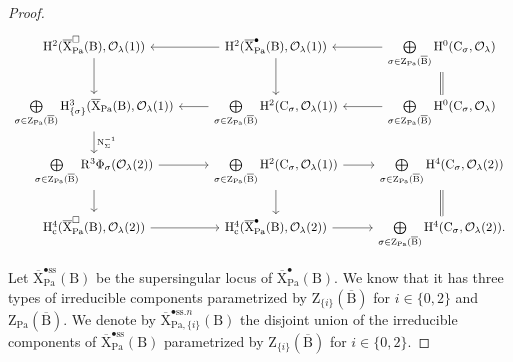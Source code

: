 \documentclass[10pt]{amsart}
\numberwithin{equation}{section}
\theoremstyle{definition}
\def\Pa{\mathrm{Pa}}
\def\calO{\mathcal{O}}
\def\rmc{\mathrm{c}}
\def\rmB{\mathrm{B}}
\def\rmC{\mathrm{C}}
\def\rmH{\mathrm{H}}
\def\rmN{\mathrm{N}}
\def\rmR{\mathrm{R}}
\def\rmX{\mathrm{X}}
\def\rmZ{\mathrm{Z}}
\begin{document}
\begin{proof}
\begin{equation*}
\begin{tikzcd}
\rmH^{2}(\overline{\rmX}^{\square}_{\Pa}(\rmB), \calO_{\lambda}(1)) \arrow[d] & \rmH^{2}(\overline{\rmX}^{\bullet}_{\Pa}(\rmB), \calO_{\lambda}(1)) \arrow[l] \arrow[d] & \bigoplus\limits_{\sigma\in \rmZ_{\Pa}(\overline{\rmB})}\rmH^{0}(\rmC_{\sigma}, \calO_{\lambda}) \arrow[l] \arrow[d, equal] \\
\bigoplus\limits_{\sigma\in \rmZ_{\Pa}(\overline{\rmB})}\rmH^{3}_{\{\sigma\}}(\overline{\rmX}_{\Pa}(\rmB), \calO_{\lambda}(1))  \arrow[d, "\rmN^{-1}_{\Sigma}"]           &  \bigoplus\limits_{\sigma\in \rmZ_{\Pa}(\overline{\rmB})}\rmH^{2}(\rmC_{\sigma}, \calO_{\lambda}(1))  \arrow[l]           &  \bigoplus\limits_{\sigma\in \rmZ_{\Pa}(\overline{\rmB})}\rmH^{0}(\rmC_{\sigma}, \calO_{\lambda}) \arrow[l]                                \\
\bigoplus\limits_{\sigma\in \rmZ_{\Pa}(\overline{\rmB})}\rmR^{3}\Phi_{\sigma}(\calO_{\lambda}(2))  \arrow[r] \arrow[d] & \bigoplus\limits_{\sigma\in \rmZ_{\Pa}(\overline{\rmB})}\rmH^{2}(\rmC_{\sigma}, \calO_{\lambda}(1))  \arrow[r] \arrow[d] & \bigoplus\limits_{\sigma\in \rmZ_{\Pa}(\overline{\rmB})}\rmH^{4}(\rmC_{\sigma}, \calO_{\lambda}(2))  \arrow[d, equal]           \\
\rmH^{4}_{\rmc}(\overline{\rmX}^{\square}_{\Pa}(\rmB), \calO_{\lambda}(2)) \arrow[r]           & \rmH^{4}_{\rmc}(\overline{\rmX}^{\bullet}_{\Pa}(\rmB), \calO_{\lambda}(2))\arrow[r]           &\bigoplus\limits_{\sigma\in \rmZ_{\Pa}(\overline{\rmB})}\rmH^{4}(\rmC_{\sigma}, \calO_{\lambda}(2)).                                   
\end{tikzcd}
\end{equation*}

Let $\overline{\rmX}^{\bullet\mathrm{ss}}_{\Pa}(\rmB)$ be the supersingular locus of $\overline{\rmX}^{\bullet}_{\Pa}(\rmB)$. We know that it has three types of irreducible components parametrized by $\rmZ_{\{i\}}(\overline{\rmB})$ for $i\in\{0,2\}$ and $\rmZ_{\Pa}(\overline{\rmB})$. We denote by $\overline{\rmX}^{\bullet\mathrm{ss}.n}_{\Pa, \{i\}}(\rmB)$ the disjoint union of the irreducible components of $\overline{\rmX}^{\bullet\mathrm{ss}}_{\Pa}(\rmB)$ parametrized by $\rmZ_{\{i\}}(\overline{\rmB})$ for $i\in\{0,2\}$. 


\end{proof}
\end{document}
